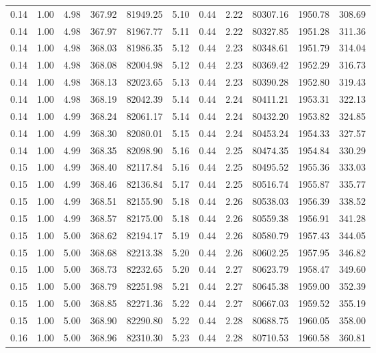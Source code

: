 \begin{table}[!ht]
\begin{tabular}{rrrrrrrrrrr}
0.14 & 1.00 & 4.98 & 367.92 & 81949.25 & 5.10 & 0.44 & 2.22 & 80307.16 & 1950.78 & 308.69 \\
0.14 & 1.00 & 4.98 & 367.97 & 81967.77 & 5.11 & 0.44 & 2.22 & 80327.85 & 1951.28 & 311.36 \\
0.14 & 1.00 & 4.98 & 368.03 & 81986.35 & 5.12 & 0.44 & 2.23 & 80348.61 & 1951.79 & 314.04 \\
0.14 & 1.00 & 4.98 & 368.08 & 82004.98 & 5.12 & 0.44 & 2.23 & 80369.42 & 1952.29 & 316.73 \\
0.14 & 1.00 & 4.98 & 368.13 & 82023.65 & 5.13 & 0.44 & 2.23 & 80390.28 & 1952.80 & 319.43 \\
0.14 & 1.00 & 4.98 & 368.19 & 82042.39 & 5.14 & 0.44 & 2.24 & 80411.21 & 1953.31 & 322.13 \\
0.14 & 1.00 & 4.99 & 368.24 & 82061.17 & 5.14 & 0.44 & 2.24 & 80432.20 & 1953.82 & 324.85 \\
0.14 & 1.00 & 4.99 & 368.30 & 82080.01 & 5.15 & 0.44 & 2.24 & 80453.24 & 1954.33 & 327.57 \\
0.14 & 1.00 & 4.99 & 368.35 & 82098.90 & 5.16 & 0.44 & 2.25 & 80474.35 & 1954.84 & 330.29 \\
0.15 & 1.00 & 4.99 & 368.40 & 82117.84 & 5.16 & 0.44 & 2.25 & 80495.52 & 1955.36 & 333.03 \\
0.15 & 1.00 & 4.99 & 368.46 & 82136.84 & 5.17 & 0.44 & 2.25 & 80516.74 & 1955.87 & 335.77 \\
0.15 & 1.00 & 4.99 & 368.51 & 82155.90 & 5.18 & 0.44 & 2.26 & 80538.03 & 1956.39 & 338.52 \\
0.15 & 1.00 & 4.99 & 368.57 & 82175.00 & 5.18 & 0.44 & 2.26 & 80559.38 & 1956.91 & 341.28 \\
0.15 & 1.00 & 5.00 & 368.62 & 82194.17 & 5.19 & 0.44 & 2.26 & 80580.79 & 1957.43 & 344.05 \\
0.15 & 1.00 & 5.00 & 368.68 & 82213.38 & 5.20 & 0.44 & 2.26 & 80602.25 & 1957.95 & 346.82 \\
0.15 & 1.00 & 5.00 & 368.73 & 82232.65 & 5.20 & 0.44 & 2.27 & 80623.79 & 1958.47 & 349.60 \\
0.15 & 1.00 & 5.00 & 368.79 & 82251.98 & 5.21 & 0.44 & 2.27 & 80645.38 & 1959.00 & 352.39 \\
0.15 & 1.00 & 5.00 & 368.85 & 82271.36 & 5.22 & 0.44 & 2.27 & 80667.03 & 1959.52 & 355.19 \\
0.15 & 1.00 & 5.00 & 368.90 & 82290.80 & 5.22 & 0.44 & 2.28 & 80688.75 & 1960.05 & 358.00 \\
0.16 & 1.00 & 5.00 & 368.96 & 82310.30 & 5.23 & 0.44 & 2.28 & 80710.53 & 1960.58 & 360.81 \\

\end{tabular}
\end{table}
